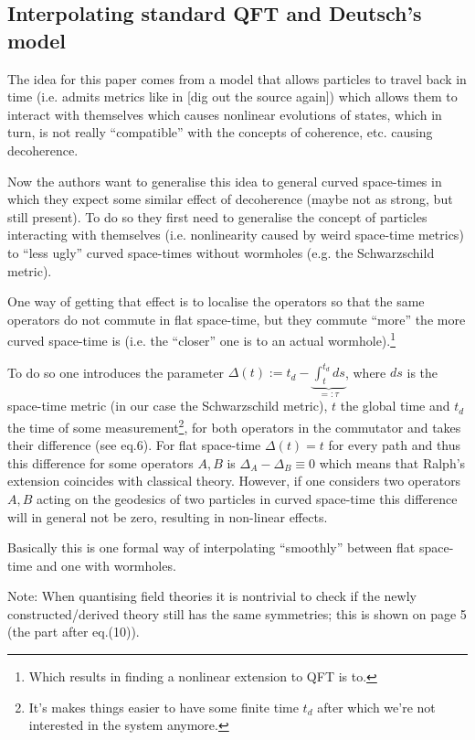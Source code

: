 \documentclass[11pt]{report}
\begin{document}
\subsection{Interpolating standard QFT and Deutsch's model}

The idea for this paper comes from a model that allows particles to travel back in time (i.e. admits metrics like in [dig out the source again]) which allows them to interact with themselves which causes nonlinear evolutions of states, which in turn, is not really ``compatible'' with the concepts of coherence, etc. causing decoherence.
		
Now the authors want to generalise this idea to general curved space-times in which they expect some similar effect of decoherence (maybe not as strong, but still present). To do so they first need to generalise the concept of particles interacting with themselves (i.e. nonlinearity caused by weird space-time metrics) to ``less ugly'' curved space-times without wormholes (e.g. the Schwarzschild metric).

One way of getting that effect is to localise the operators so that the same operators do not commute in flat space-time, but they commute ``more'' the more curved space-time is (i.e. the ``closer'' one is to an actual wormhole).\footnote{Which results in finding a nonlinear extension to QFT is to.}

To do so one introduces the parameter $\Delta(t) := t_d - \underbrace{\int_t^{t_d}ds}_{=:\tau}$, where $ds$ is the space-time metric (in our case the Schwarzschild metric), $t$ the global time and $t_d$ the time of some measurement\footnote{It's makes things easier to have some finite time $t_d$ after which we're not interested in the system anymore.}, for both operators in the commutator and takes their difference (see eq.6). For flat space-time $\Delta(t)=t$ for every path and thus this difference for some operators $A,B$ is $\Delta_A - \Delta_B \equiv 0$ which means that Ralph's extension coincides with classical theory. However, if one considers two operators $A,B$ acting on the geodesics of two particles in curved space-time this difference will in general not be zero, resulting in non-linear effects.

Basically this is one formal way of interpolating ``smoothly'' between flat space-time and one with wormholes.

Note: When quantising field theories it is nontrivial to check if the newly constructed/derived theory still has the same symmetries; this is shown on page 5 (the part after eq.(10)).
\end{document}
